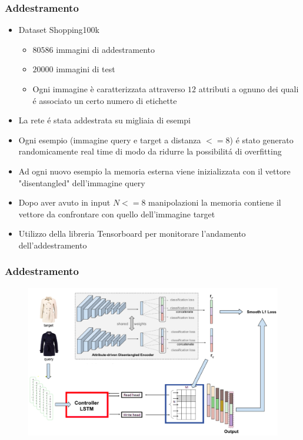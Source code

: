 \documentclass{beamer}
\begin{document}
\begin{frame}
\frametitle{Addestramento}
\begin{itemize} 
\item <1-> Dataset Shopping100k
\begin{itemize}
	\item <2-> $80586$ immagini di addestramento
	\item <3-> $20000$ immagini di test
	\item <4-> Ogni immagine è caratterizzata attraverso $12$ attributi a ognuno dei quali \'e associato un certo numero di etichette
\end{itemize}
\item <5-> La rete \'e stata addestrata su migliaia di esempi
\item <6-> Ogni esempio (immagine query e target a distanza $<= 8$) \'e stato generato randomicamente real time di modo da ridurre la possibilit\'a di overfitting
\item <7-> Ad ogni nuovo esempio la memoria esterna viene inizializzata con il vettore "disentangled" dell'immagine query
\item <8-> Dopo aver avuto in input $N <= 8$ manipolazioni la memoria contiene il vettore da confrontare con quello dell'immagine target
\item <9-> Utilizzo della libreria Tensorboard per monitorare l'andamento dell'addestramento
\end{itemize}
\end{frame}

\begin{frame}
\frametitle{Addestramento}
\begin{figure}[!h]
 			\begin{center}
 			\includegraphics[scale=0.3]{"Immagini/All2.png"}
 			\end{center}
\end{figure}
\end{frame}
\end{document}
